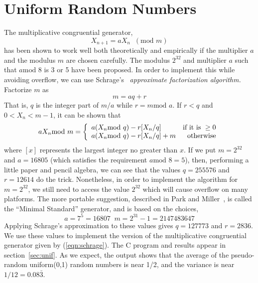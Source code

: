 \documentclass{article}
\newcommand{\mod}{\mbox{mod }}
\begin{document}
\section{Uniform Random Numbers}
The multiplicative congruential generator, 
\[
X_{n+1} = aX_{n} \;\;(\mod m)
\]
has been shown to work well both theoretically and empirically if
the multiplier $a$ and the modulus $m$ are chosen carefully.
The modulus $2^{32}$ and multiplier $a$ such that $a \mod 8$
is 3 or 5 have been proposed.  In order to implement this while
avoiding overflow, we can use Schrage's~\cite{schrage} 
\emph{approximate factorization algorithm.}  Factorize $m$ as
\begin{equation}
\label{eqn:factor}
m = aq + r
\end{equation}
That is, $q$ is the integer part of $m/a$ while $r = m \mod a$.
If $r<q$ and $0 < X_n < m-1$, it can be shown that 
\begin{equation}
\label{eqn:schrage}
aX_n \mod m = \left\{ 
\begin{array}{l r}
a(X_n \mod q) - r [X_n/q] & \mbox{if it is }\geq 0\\
a(X_n \mod q) - r [X_n/q] + m & \mbox{otherwise}
\end{array}\right.
\end{equation}
where $[x]$ represents the largest integer no greater than $x$.
If we put $m = 2^{32}$ and $a = 16805$ (which satisfies the requirement
$a \mod 8 = 5$), then, performing a little paper and pencil
algebra, we can see that the values $q = 255576$ and $r = 12614$
do the trick.  Nonetheless, in order to implement the algorithm
for $m = 2^{32}$, we still need to access the value $2^{32}$ 
which will cause overflow on many platforms.  
The more portable suggestion, described
in Park and Miller~\cite{P&M}, is called the ``Minimal Standard''
generator, and is based on the choices,
\[a = 7^5 = 16807 \;\; m = 2^{31} - 1 = 2147483647 \]
Applying Schrage's approximation to these values gives $q = 127773$
and $ r = 2836$.  We use these values to implement the 
version of the multiplicative
congruential generator given by (\ref{eqn:schrage}).
The C program and results appear in section~\ref{sec:unif}.
As we expect, the output shows that the average of the pseudo-random
uniform(0,1) random numbers is near 1/2, and the variance is
near $1/12 = 0.08\bar{3}$.
\end{document}
